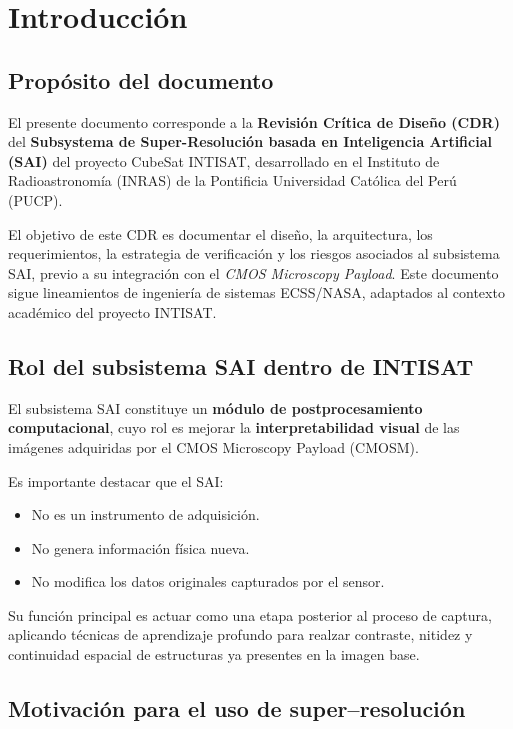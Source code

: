 \chapter{Introducción}
\label{ch:introduccion}

\section{Propósito del documento}

El presente documento corresponde a la \textbf{Revisión Crítica de Diseño (CDR)}
del \textbf{Subsystema de Super-Resolución basada en Inteligencia Artificial
(SAI)} del proyecto CubeSat INTISAT, desarrollado en el Instituto de
Radioastronomía (INRAS) de la Pontificia Universidad Católica del Perú (PUCP).

El objetivo de este CDR es documentar el diseño, la arquitectura, los
requerimientos, la estrategia de verificación y los riesgos asociados al
subsistema SAI, previo a su integración con el \textit{CMOS Microscopy Payload}.
Este documento sigue lineamientos de ingeniería de sistemas ECSS/NASA, adaptados
al contexto académico del proyecto INTISAT.

\section{Rol del subsistema SAI dentro de INTISAT}

El subsistema SAI constituye un \textbf{módulo de postprocesamiento
computacional}, cuyo rol es mejorar la \textbf{interpretabilidad visual} de las
imágenes adquiridas por el CMOS Microscopy Payload (CMOSM).

Es importante destacar que el SAI:
\begin{itemize}
    \item No es un instrumento de adquisición.
    \item No genera información física nueva.
    \item No modifica los datos originales capturados por el sensor.
\end{itemize}

Su función principal es actuar como una etapa posterior al proceso de captura,
aplicando técnicas de aprendizaje profundo para realzar contraste, nitidez y
continuidad espacial de estructuras ya presentes en la imagen base.

\section{Motivación para el uso de super--resolución}


